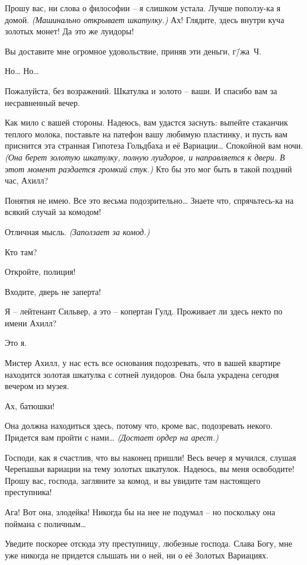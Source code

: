 \documentclass[../main.tex]{subfiles}
\begin{document}
\begin{dialogue}
 Прошу вас, ни слова о философии \--- я слишком устала. Лучше поползу-ка я домой. \emph{(Машинально открывает шкатулку.)} Ах! Глядите, здесь внутри куча золотых монет! Да это же луидоры!

 Вы доставите мне огромное удовольствие, приняв эти деньги, г\=/жа~Ч.

 Но\ldots{} Но\ldots{}

 Пожалуйста, без возражений. Шкатулка и золото \--- ваши. И спасибо вам за несравненный вечер.

 Как мило с вашей стороны. Надеюсь, вам удастся заснуть: выпейте стаканчик теплого молока, поставьте на патефон вашу любимую пластинку, и пусть вам приснится эта странная Гипотеза Гольдбаха и её Вариации\ldots{} Спокойной вам ночи. \emph{(Она берет золотую шкатулку, полную луидоров, и направляется к двери. В этот момент раздается громкий стук.)} Кто бы это мог быть в такой поздний час, Ахилл?

 Понятия не имею. Все это весьма подозрительно\ldots{} Знаете что, спрячьтесь-ка на всякий случай за комодом!

 Отличная мысль. \emph{(Заползает за комод.)}

 Кто там?

 Откройте, полиция!

 Входите, дверь не заперта!


 Я \--- лейтенант Сильвер, а это \--- копертан Гулд. Проживает ли здесь некто по имени Ахилл?

 Это я.

 Мистер Ахилл, у нас есть все основания подозревать, что в вашей квартире находится золотая шкатулка с сотней луидоров. Она была украдена сегодня вечером из музея.

 Ах, батюшки!

 Она должна находиться здесь, потому что, кроме вас, подозревать некого. Придется вам пройти с нами\ldots{} \emph{(Достает ордер на арест.)}

 Господи, как я счастлив, что вы наконец пришли! Весь вечер я мучился, слушая Черепашьи вариации на тему золотых шкатулок. Надеюсь, вы меня освободите! Прошу вас, господа, загляните за комод, и вы увидите там настоящего преступника!


 Ага! Вот она, злодейка! Никогда бы на нее не подумал \--- но поскольку она поймана с поличным\ldots{}

 Уведите поскорее отсюда эту преступницу, любезные господа. \mbox{Слава} Богу, мне уже никогда не придется слышать ни о ней, ни о её Золотых Вариациях.

\end{dialogue}
\end{document}
